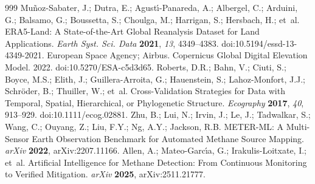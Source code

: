 \documentclass[notspecified,datadescriptor,submit,oneauthor]{Definitions/mdpi}
\begin{document}
\begin{thebibliography}{999}
Mu{\~n}oz-Sabater, J.; Dutra, E.; Agust{\'\i}-Panareda, A.; Albergel, C.; Arduini, G.; Balsamo, G.; Boussetta, S.; Choulga, M.; Harrigan, S.; Hersbach, H.; et~al. ERA5-Land: A State-of-the-Art Global Reanalysis Dataset for Land Applications. {\em Earth Syst. Sci. Data} {\bf 2021}, {\em 13}, 4349--4383. doi:10.5194/essd-13-4349-2021.
European Space Agency; Airbus. Copernicus Global Digital Elevation Model. 2022. doi:10.5270/ESA-c5d3d65.
Roberts, D.R.; Bahn, V.; Ciuti, S.; Boyce, M.S.; Elith, J.; Guillera-Arroita, G.; Hauenstein, S.; Lahoz-Monfort, J.J.; Schr{\"o}der, B.; Thuiller, W.; et~al. Cross-Validation Strategies for Data with Temporal, Spatial, Hierarchical, or Phylogenetic Structure. {\em Ecography} {\bf 2017}, {\em 40}, 913--929. doi:10.1111/ecog.02881.
Zhu, B.; Lui, N.; Irvin, J.; Le, J.; Tadwalkar, S.; Wang, C.; Ouyang, Z.; Liu, F.Y.; Ng, A.Y.; Jackson, R.B. METER-ML: A Multi-Sensor Earth Observation Benchmark for Automated Methane Source Mapping. {\em arXiv} {\bf 2022}, arXiv:2207.11166.
Allen, A.; Mateo-Garc{\'\i}a, G.; Irakulis-Loitxate, I.; et~al. Artificial Intelligence for Methane Detection: From Continuous Monitoring to Verified Mitigation. {\em arXiv} {\bf 2025}, arXiv:2511.21777.\end{thebibliography}
\end{document}
